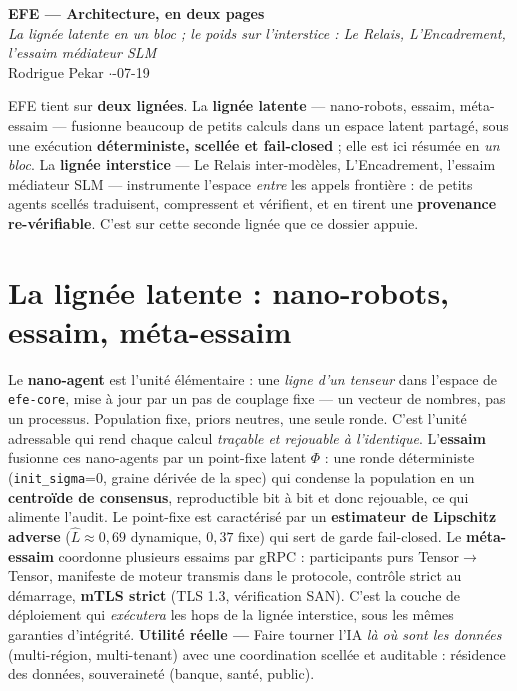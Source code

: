 \documentclass[11pt]{article}
\newcommand{\utilite}[1]{{\color{efeplum}\textbf{Utilité réelle —} }#1\par}
\begin{document}
\begin{center}
{\LARGE\bfseries\color{efenavy} EFE — Architecture, en deux pages}\\[2pt]
{\color{efegray}\itshape La lignée latente en un bloc ; le poids sur l'interstice :
Le Relais, L'Encadrement, l'essaim médiateur SLM}\\[3pt]
{\small\color{efegray}Rodrigue Pekar \quad$\cdot$-07-19}
\end{center}
\vspace{1pt}

\begin{these}
EFE tient sur \textbf{deux lignées}. La \textbf{lignée latente} — nano-robots, essaim, méta-essaim
— fusionne beaucoup de petits calculs dans un espace latent partagé, sous une exécution
\textbf{déterministe, scellée et fail-closed} ; elle est ici résumée en \emph{un bloc}. La
\textbf{lignée interstice} — Le Relais inter-modèles, L'Encadrement, l'essaim médiateur SLM —
instrumente l'espace \emph{entre} les appels frontière : de petits agents scellés traduisent,
compressent et vérifient, et en tirent une \textbf{provenance re-vérifiable}. C'est sur cette
seconde lignée que ce dossier appuie.
\end{these}

\section{La lignée latente : nano-robots, essaim, méta-essaim}
Le \textbf{nano-agent} est l'unité élémentaire : une \emph{ligne d'un tenseur} dans l'espace de
\texttt{efe-core}, mise à jour par un pas de couplage fixe — un vecteur de nombres, pas un
processus. Population fixe, priors neutres, une seule ronde. C'est l'unité adressable qui rend
chaque calcul \emph{traçable et rejouable à l'identique}. L'\textbf{essaim} fusionne ces
nano-agents par un point-fixe latent $\Phi$ : une ronde déterministe (\texttt{init\_sigma}=0,
graine dérivée de la spec) qui condense la population en un \textbf{centroïde de consensus},
reproductible bit à bit et donc rejouable, ce qui alimente l'audit. Le point-fixe est caractérisé
par un \textbf{estimateur de Lipschitz adverse} ($\hat{L}\approx0{,}69$ dynamique, $0{,}37$ fixe)
qui sert de garde fail-closed. Le \textbf{méta-essaim} coordonne plusieurs essaims par gRPC :
participants purs Tensor$\rightarrow$Tensor, manifeste de moteur transmis dans le protocole,
contrôle strict au démarrage, \textbf{mTLS strict} (TLS 1.3, vérification SAN). C'est la couche de
déploiement qui \emph{exécutera} les hops de la lignée interstice, sous les mêmes garanties
d'intégrité.
\utilite{Faire tourner l'IA \emph{là où sont les données} (multi-région, multi-tenant) avec une
coordination scellée et auditable : résidence des données, souveraineté (banque, santé, public).}
\end{document}
